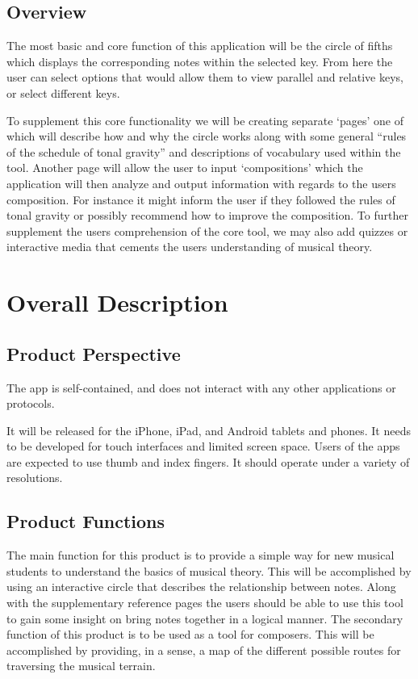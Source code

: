 \documentclass[onecolumn, draftclsnofoot,10pt, compsoc]{IEEEtran}
\begin{document}
\subsection{Overview}
\par
The most basic and core function of this application will be the circle of fifths which displays the corresponding notes within the selected key. 
From here the user can select options that would allow them to view parallel and relative keys, or select different keys. 

\par
To supplement this core functionality we will be creating separate ‘pages’ one of which will describe how and why the circle works along with some general “rules of the schedule of tonal gravity” and descriptions of vocabulary used within the tool.
Another page will allow the user to input ‘compositions’ which the application will then analyze and output information with regards to the users composition.
For instance it might inform the user if they followed the rules of tonal gravity or possibly recommend how to improve the composition.
To further supplement the users comprehension of the core tool, we may also add quizzes or interactive media that cements the users understanding of musical theory. 

\pagebreak
\section{Overall Description}
\subsection{Product Perspective}
\par
The app is self-contained, and does not interact with any other applications or protocols. 
\par 
It will be released for the iPhone, iPad, and Android tablets and phones.
It needs to be developed for touch interfaces and limited screen space.
Users of the apps are expected to use thumb and index fingers.
It should operate under a variety of resolutions.

\subsection{Product Functions}
\par
The main function for this product is to provide a simple way for new musical students to understand the basics of musical theory.
This will be accomplished by using an interactive circle that describes the relationship between notes.
Along with the supplementary reference pages the users should be able to use this tool to gain some insight on bring notes together in a logical manner.
The secondary function of this product is to be used as a tool for composers.
This will be accomplished by providing, in a sense, a map of the different possible routes for traversing the musical terrain. 
\end{document}
